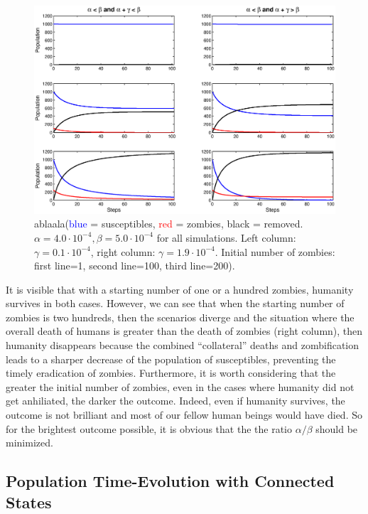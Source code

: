 \documentclass[11pt]{article} %
\begin{document}
\begin{figure}[h!]
\centerline{
\includegraphics[scale=0.55]{../images/Matlab_figures/model-AltB.eps}}
\caption{ablaala(\textcolor{blue}{blue} = susceptibles, \textcolor{red}{red} = zombies, black = removed. $\alpha=4.0\cdot10^{-4}, \beta=5.0\cdot10^{-4}$ for all simulations. Left column: $\gamma=0.1\cdot10^{-4}$, right column: $\gamma=1.9\cdot10^{-4}$. Initial number of zombies: first line=1, second line=100, third line=200). \label{gamma_population} }
\end{figure}

It is visible that with a starting number of one or a hundred zombies, humanity survives in both cases. However, we can see that when the starting number of zombies is two hundreds, then the scenarios diverge and the situation where the overall death of humans is greater than the death of zombies (right column), then humanity disappears because the combined ``collateral''  deaths and zombification leads to a sharper decrease of the population of susceptibles, preventing the timely eradication of zombies. Furthermore, it is worth considering that the greater the initial number of zombies, even in the cases where humanity did not get anhiliated, the darker the outcome. Indeed, even if humanity survives, the outcome is not brilliant and most of our fellow human beings would have died. So for the brightest outcome possible, it is obvious that the the ratio $\alpha/\beta$ should be minimized.


\subsection{Population Time-Evolution with Connected States}\indent
 
\end{document}
